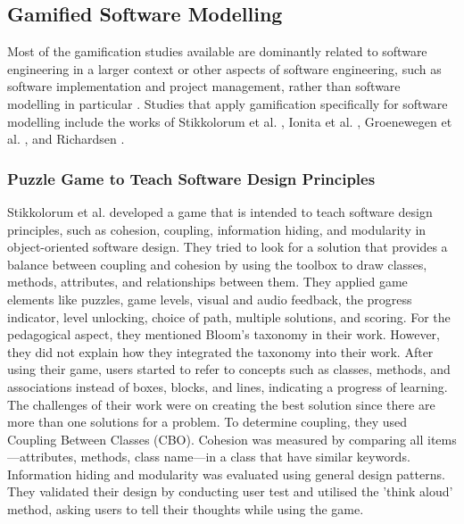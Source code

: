 \documentclass[12pt, a4paper]{report}
\begin{document}
\subsection{Gamified Software Modelling}
Most of the gamification studies available are dominantly related to software engineering in a larger context or other aspects of software engineering, such as software implementation and project management, rather than software modelling in particular \cite{Pedreira2015}. Studies that apply gamification specifically for software modelling include the works of Stikkolorum et al. \cite{Stikkolorum2014}, Ionita et al. \cite{Ionita2015}, Groenewegen et al. \cite{Groenewegen2010}, and Richardsen \cite{Richardsen2014}. 

\subsubsection{Puzzle Game to Teach Software Design Principles}
Stikkolorum et al. \cite{Stikkolorum2014} developed a game that is intended to teach software design principles, such as cohesion, coupling, information hiding, and modularity in object-oriented software design. They tried to look for a solution that provides a balance between coupling and cohesion by using the toolbox to draw classes, methods, attributes, and relationships between them. They applied game elements like puzzles, game levels, visual and audio feedback, the progress indicator, level unlocking, choice of path, multiple solutions, and scoring. For the pedagogical aspect, they mentioned Bloom’s taxonomy in their work. However, they did not explain how they integrated the taxonomy into their work. After using their game, users started to refer to concepts such as classes, methods, and associations instead of boxes, blocks, and lines, indicating a progress of learning. The challenges of their work were on creating the best solution since there are more than one solutions for a problem. To determine coupling, they used Coupling Between Classes (CBO). Cohesion was measured by comparing all items---attributes, methods, class name---in a class that have similar keywords. Information hiding and modularity was evaluated using general design patterns. They validated their design by conducting user test and utilised the 'think aloud' method, asking users to tell their thoughts while using the game. 
\end{document}

